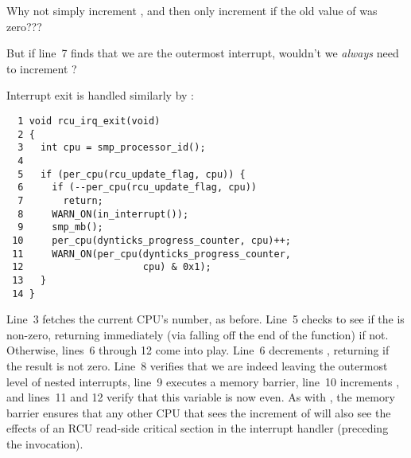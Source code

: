 \QuickQuiz{}
	Why not simply increment , and then only
	increment  if the old value
	of  was zero???
 \QuickQuizEnd

\QuickQuiz{}
	But if line~7 finds that we are the outermost interrupt,
	wouldn't we \emph{always} need to increment
	?
 \QuickQuizEnd

Interrupt exit is handled similarly by
:

{ \scriptsize
\begin{verbatim}
  1 void rcu_irq_exit(void)
  2 {
  3   int cpu = smp_processor_id();
  4
  5   if (per_cpu(rcu_update_flag, cpu)) {
  6     if (--per_cpu(rcu_update_flag, cpu))
  7       return;
  8     WARN_ON(in_interrupt());
  9     smp_mb();
 10     per_cpu(dynticks_progress_counter, cpu)++;
 11     WARN_ON(per_cpu(dynticks_progress_counter,
 12                     cpu) & 0x1);
 13   }
 14 }
\end{verbatim}
}

Line~3 fetches the current CPU's number, as before.
Line~5 checks to see if the  is
non-zero, returning immediately (via falling off the end of the
function) if not.
Otherwise, lines~6 through 12 come into play.
Line~6 decrements , returning
if the result is not zero.
Line~8 verifies that we are indeed leaving the outermost
level of nested interrupts, line~9 executes a memory barrier,
line~10 increments ,
and lines~11 and 12 verify that this variable is now even.
As with , the memory barrier ensures that
any other CPU that sees the increment of
will also see the effects of an RCU read-side critical section
in the interrupt handler (preceding the 
invocation).

